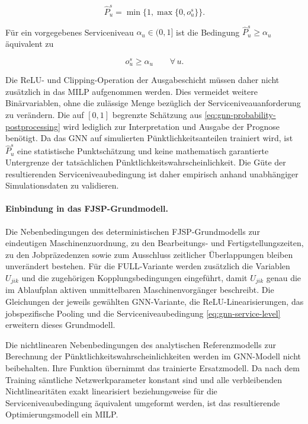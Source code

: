 \begin{equation}
\widehat{P}_{u}^{s}
=
\min\bigl\{1,\max\{0,o_u^s\}\bigr\}.
\label{eq:gnn-probability-postprocessing}
\end{equation}

Für ein vorgegebenes Serviceniveau $\alpha_u\in(0,1]$ ist die Bedingung
$\widehat{P}_{u}^{s}\ge\alpha_u$ äquivalent zu

\begin{equation}
o_u^s\ge\alpha_u
\qquad
\forall\,u.
\label{eq:gnn-service-level}
\end{equation}

Die ReLU- und Clipping-Operation der Ausgabeschicht müssen daher nicht
zusätzlich in das MILP aufgenommen werden. Dies vermeidet weitere
Binärvariablen, ohne die zulässige Menge bezüglich der
Serviceniveauanforderung zu verändern. Die auf $[0,1]$ begrenzte Schätzung
aus \eqref{eq:gnn-probability-postprocessing} wird lediglich zur Interpretation
und Ausgabe der Prognose benötigt. Da das GNN auf simulierten
Pünktlichkeitsanteilen trainiert wird, ist $\widehat{P}_{u}^{s}$ eine
statistische Punktschätzung und keine mathematisch garantierte Untergrenze der
tatsächlichen Pünktlichkeitswahrscheinlichkeit. Die Güte der resultierenden
Serviceniveaubedingung ist daher empirisch anhand unabhängiger
Simulationsdaten zu validieren.

\paragraph{Einbindung in das FJSP-Grundmodell.}

Die Nebenbedingungen des deterministischen FJSP-Grundmodells zur eindeutigen
Maschinenzuordnung, zu den Bearbeitungs- und Fertigstellungszeiten, zu den
Jobpräzedenzen sowie zum Ausschluss zeitlicher Überlappungen bleiben
unverändert bestehen. Für die FULL-Variante werden zusätzlich die Variablen
$U_{jik}$ und die zugehörigen Kopplungsbedingungen eingeführt, damit $U_{jik}$
genau die im Ablaufplan aktiven unmittelbaren Maschinenvorgänger beschreibt.
Die Gleichungen der jeweils gewählten GNN-Variante, die
ReLU-Linearisierungen, das jobspezifische Pooling und die
Serviceniveaubedingung \eqref{eq:gnn-service-level} erweitern dieses
Grundmodell.

Die nichtlinearen Nebenbedingungen des analytischen Referenzmodells zur
Berechnung der Pünktlichkeitswahrscheinlichkeiten werden im GNN-Modell nicht
beibehalten. Ihre Funktion übernimmt das trainierte Ersatzmodell. Da nach dem
Training sämtliche Netzwerkparameter konstant sind und alle verbleibenden
Nichtlinearitäten exakt linearisiert beziehungsweise für die
Serviceniveaubedingung äquivalent umgeformt werden, ist das resultierende
Optimierungsmodell ein MILP.
